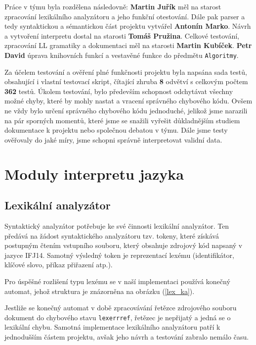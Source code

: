 \documentclass[12pt,a4paper,titlepage,final]{article}
\begin{document}
Práce v týmu byla rozdělena následovně: \textbf{Martin Juřík} měl na starost zpracování lexikálního analyzátoru a jeho funkční otestování. Dále pak parser a tedy syntaktickou a sémantickou část projektu vytvářel \textbf{Antonín Marko}. Návrh a vytvoření interpretu dostal na starosti \textbf{Tomáš Pružina}. Celkové testování, zpracování LL gramatiky a dokumentaci měl na starosti \textbf{Martin Kubíček}. \textbf{Petr David} úprava knihovních funkcí a vestavěné funkce do předmětu \verb|Algoritmy|.

Za účelem testování a ověření plné funkčnosti projektu byla napsána sada testů, obsahující i vlastní testovací skript, čítající zhruba \textbf{8} odvětví s celkovým počtem \textbf{362} testů. Úkolem testování, bylo především schopnost odchytávat všechny možné chyby, které by mohly nastat a vracení správného chybového kódu. Ovšem ne vždy bylo určení správného chybového kódu jednoduché, jelikož jsme narazili na pár sporných momentů, které jsme se snažili vyřešit důkladnějším studiem dokumentace k projektu nebo společnou debatou v týmu. Dále jsme testy ověřovaly do jaké míry, jsme schopni správně interpretovat validní data.

\section{Moduly interpretu jazyka} \label{moduly_interpretu}
\subsection{Lexikální analyzátor} \label{lexikalni_analyzator}

Syntaktický analyzátor potřebuje ke své činnosti lexikální analyzátor. Ten
předává na žádost syntaktického analyzátoru tzv. tokeny, které získává postupným
čtením vstupního souboru, který obsahuje zdrojový kód napsaný v jazyce IFJ14.
Samotný výsledný token je reprezentací lexému (identifikátor, klíčové slovo,
příkaz přiřazení atp.).

Pro úspěšné rozlišení typu lexému se v naší implementaci používá konečný
automat, jehož struktura je znázorněna na obrázku (\ref{lex_ka}).

Jestliže se konečný automat v době zpracovávání řetězce zdrojového souboru
dokument do chybového stavu \verb|lexerrref|, řetězec je nepřijatý a jedná se
o lexikální chybu. Samotná implementace lexikálního analyzátoru patří k
jednodušším částem projektu, avšak jeho návrh a testování zabralo nemálo času.
\end{document}
